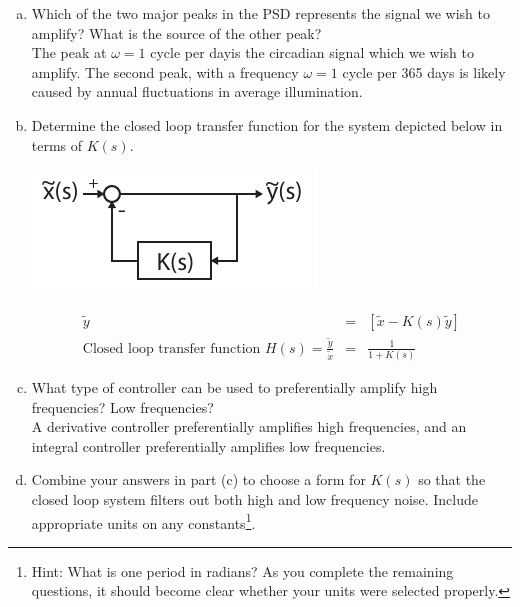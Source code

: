 \documentclass{article}
\begin{document}
\begin{enumerate}[a)]
\setlength{\itemsep}{0pt}
\item Which of the two major peaks in the PSD represents the signal we wish to amplify? What is the source of the other peak?\\

{\color{red}
The peak at $\omega = 1$ cycle per dayis the circadian signal which we wish to amplify. The second peak, with a frequency $\omega = 1$ cycle per 365 days is likely caused by annual fluctuations in average illumination.
}

\item Determine the closed loop transfer function for the system depicted below in terms of $K(s)$.

\begin{center}
\includegraphics[width=.3\textwidth]{feedback.pdf}
\end{center}

{\color{red}
\begin{eqnarray*}
\tilde{y} & = & \left[ \tilde{x} - K(s) \tilde{y} \right] \\
\textrm{Closed loop transfer function } H(s) = \frac{\tilde{y}}{\tilde{x}} & = & \frac{1}{1+K(s)}
\end{eqnarray*}
}


\item What type of controller can be used to preferentially amplify high frequencies? Low frequencies?\\

{\color{red}
A derivative controller preferentially amplifies high frequencies, and an integral controller preferentially amplifies low frequencies.
}

\item Combine your answers in part (c) to choose a form for $K(s)$ so that the closed loop system filters out both high and low frequency noise. Include appropriate units on any constants\footnote{Hint: What is one period in radians? As you complete the remaining questions, it should become clear whether your units were selected properly.}.\\


\end{enumerate}
\end{document}
